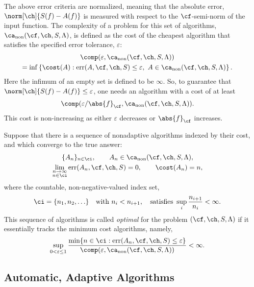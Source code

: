 \documentclass[]{elsarticle}
\DeclareMathOperator{\fix}{non}
\DeclareMathOperator{\err}{err}
\theoremstyle{definition}
\theoremstyle{remark}
\newcommand{\Fnorm}[1]{\abs{#1}_{\cf}}
\begin{document}
The above error criteria are normalized, meaning that the absolute error, $\norm[\ch]{S(f) -  A(f)}$ is measured with respect to the $\cf$-semi-norm of the input function. The complexity of a problem for this set of algorithms, $\ca_{\fix}(\cf,\ch,S,\Lambda)$, is defined as the cost of the cheapest algorithm that satisfies the specified error tolerance, $\varepsilon$:
\begin{multline} \label{fixcostcomplex}
\comp(\varepsilon,\ca_{\fix}(\cf,\ch,S,\Lambda)) \\
= \inf\left\{\cost(A) : \err(A,\cf,\ch,S) \le \varepsilon, \ A \in \ca_{\fix}(\cf,\ch,S,\Lambda) \right \}.
\end{multline}
Here the infimum of an empty set is defined to be $\infty$.  So, to guarantee that $\norm[\ch]{S(f) -  A(f)} \le \varepsilon$, one needs an algorithm with a cost of at least 
\[
\comp(\varepsilon/\Fnorm{f},\ca_{\fix}(\cf,\ch,S,\Lambda)).
\]
This cost is non-increasing as either $\varepsilon$ decreases or $\Fnorm{f}$ increases.

Suppose that there is a sequence of nonadaptive algorithms indexed by their cost, and which converge to the true answer:
\begin{subequations} \label{algseqdef}
\begin{gather} 
\{A_n\}_{n \in \ci}, \qquad A_n  \in \ca_{\fix}(\cf,\ch,S,\Lambda), \\
\lim_{\substack{n \to \infty\\ n \in \ci}} \err(A_n,\cf,\ch,S) = 0, \qquad \cost(A_n) = n,  
\end{gather}
\end{subequations}
where the countable, non-negative-valued index set, 
\begin{equation} \label{indexdef}
\ci=\{n_1, n_2, \ldots\} \quad \text{with } n_i < n_{i+1}, \quad \text{satisfies } \sup_i \frac{n_{i+1}}{n_i} <\infty. 
\end{equation} 
This sequence of algorithms is called \emph{optimal} for the problem $(\cf,\ch,S,\Lambda)$ if it essentially tracks the minimum cost algorithms, namely,
\begin{equation} \label{nearoptdef}
\sup_{0 < \varepsilon \le 1} \frac{\min\{n \in \ci : \err(A_n,\cf,\ch,S) \le \varepsilon\}} {\comp(\varepsilon,\ca_{\fix}(\cf,\ch,S,\Lambda))} <\infty.
\end{equation}

\subsection{Automatic, Adaptive Algorithms} \label{AutoAlgsec}
\end{document}
